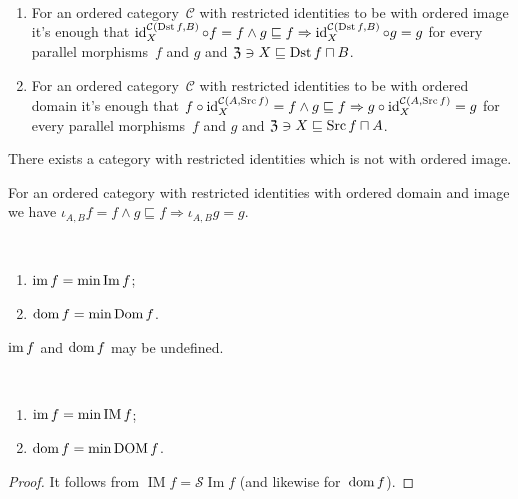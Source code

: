 \begin{obvious}
~
\begin{enumerate}
\item For an ordered category~$\mathcal{C}$ with restricted identities
to be with ordered image it's enough that
$\operatorname{id}^{\mathcal{C}(\operatorname{Dst} f,B)}_X\circ f=f\land
g\sqsubseteq f\Rightarrow
\operatorname{id}^{\mathcal{C}(\operatorname{Dst} f,B)}_X\circ g=g$
for every parallel morphisms~$f$ and $g$ and
$\mathfrak{Z}\ni X\sqsubseteq\operatorname{Dst} f\sqcap B$.
\item For an ordered category~$\mathcal{C}$ with restricted identities
to be with ordered domain it's enough that
$f\circ\operatorname{id}^{\mathcal{C}(A,\operatorname{Src} f)}_X=f\land
g\sqsubseteq f\Rightarrow
g\circ\operatorname{id}^{\mathcal{C}(A,\operatorname{Src} f)}_X=g$
for every parallel morphisms~$f$ and $g$ and
$\mathfrak{Z}\ni X\sqsubseteq\operatorname{Src} f\sqcap A$.
\end{enumerate}
\end{obvious}

\begin{conjecture}
There exists a category with restricted identities which
is not with ordered image.
\end{conjecture}

\begin{obvious}
For an ordered category with restricted identities with
ordered domain and image we have
$\iota_{A,B}f=f\land g\sqsubseteq f\Rightarrow
\iota_{A,B}g=g$.
\end{obvious}

\begin{defn}
~
\begin{enumerate}
\item $\operatorname{im} f = \min\operatorname{Im} f$;
\item $\operatorname{dom} f = \min\operatorname{Dom} f$.
\end{enumerate}
\end{defn}

\begin{note}
$\operatorname{im} f$ and $\operatorname{dom} f$ may be undefined.
\end{note}

\begin{prop}
~
\begin{enumerate}
\item $\operatorname{im} f = \min\operatorname{IM} f$;
\item $\operatorname{dom} f = \min\operatorname{DOM} f$.
\end{enumerate}
\end{prop}

\begin{proof}
It follows from $\operatorname{IM}f=\mathscr{S}\operatorname{Im}f$
(and likewise for~$\operatorname{dom} f$).
\end{proof}

